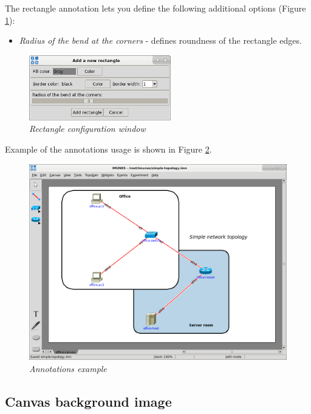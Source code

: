 The rectangle annotation lets you define the following additional options
(Figure \ref{fig:rectangle_conf}):
\begin{itemize}
    \item \emph{Radius of the bend at the corners} - defines roundness of the
rectangle edges.
\end{itemize}

\begin{figure}[H]
	\centering
	\vspace{10pt}
	\includegraphics[width=0.55\textwidth]{./images/rectangle_conf.png}
	\caption{\emph{Rectangle configuration window}}
	\label{fig:rectangle_conf}
\end{figure}

Example of the annotations usage is shown in Figure \ref{fig:annotations_example}.

\begin{figure}[H]
	\centering
	\vspace{10pt}
	\includegraphics[width=\textwidth]{./images/annotations_example.png}
	\caption{\emph{Annotations example}}
	\label{fig:annotations_example}
\end{figure}

\subsection{Canvas background image}
\label{sec:CanvasBackgroundImage}

